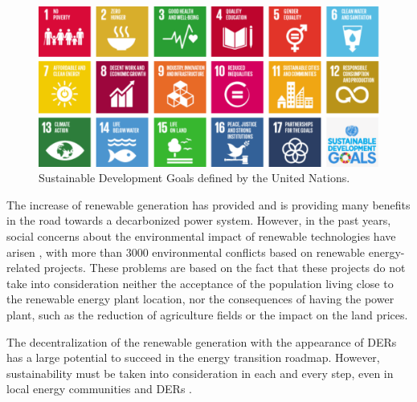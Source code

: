\begin{figure}[h]
	\centering 
	\includegraphics[width=1\columnwidth ]{ChapterIntro/Figures/SDG.png}
		\caption{Sustainable Development Goals defined by the United Nations.}  
		\label{fig:sdg}
\end{figure}    

The increase of renewable generation has provided and is providing many benefits in the road towards a decarbonized power system. However, in the past years, social concerns about the environmental impact of renewable technologies have arisen \cite{Temper2020}, with more than 3000 environmental conflicts based on renewable energy-related projects. These problems are based on the fact that these projects do not take into consideration neither the acceptance of the population living close to the renewable energy plant location, nor the consequences of having the power plant, such as the reduction of agriculture fields or the impact on the land prices. 


The decentralization of the renewable generation with the appearance of DERs has a large potential to succeed in the energy transition roadmap. However, sustainability must be taken into consideration in each and every step, even in local energy communities and DERs \cite{AMPONSAH2014461}.

